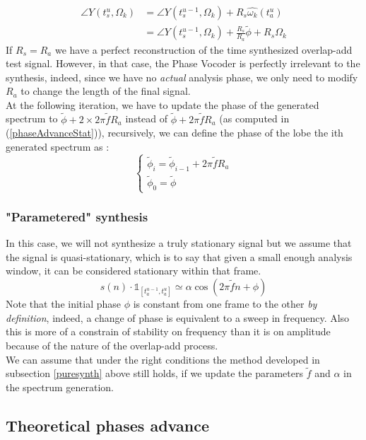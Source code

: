 \documentclass[]{article}
\begin{document}
\begin{equation*}
\begin{split}
\angle Y(t_s^u, \Omega_k) & = \angle Y(t_s^{u-1}, \Omega_k) + R_s \hat{\omega_k}(t_a^u)\\
& = \angle Y(t_s^{u-1}, \Omega_k) + \frac{R_s}{R_a}\tilde{\phi} + R_s\Omega_k
\end{split}
\end{equation*}
If $R_s = R_a$ we have a perfect reconstruction of the time synthesized overlap-add test signal. However, in that case, the Phase Vocoder is perfectly irrelevant to the synthesis, indeed, since we have no \emph{actual} analysis phase, we only need to modify $R_a$ to change the length of the final signal.\\
At the following iteration, we have to update the phase of the generated spectrum to $\tilde{\phi} + 2\times2\pi \tilde{f} R_a$ instead of $\tilde{\phi} + 2\pi \tilde{f} R_a$ (as computed in (\ref{phaseAdvanceStat})), recursively, we can define the phase of the lobe the ith generated spectrum as :
\begin{equation}
\begin{cases}
\tilde{\phi}_i = \tilde{\phi}_{i-1} + 2\pi \tilde{f} R_a \\
\tilde{\phi}_0 = \tilde{\phi}
\end{cases}
\end{equation}
\subsubsection{"Parametered" synthesis}
In this case, we will not synthesize a truly stationary signal but we assume that the signal is quasi-stationary, which is to say that given a small enough analysis window, it can be considered stationary within that frame.
\begin{equation}
s(n)\cdot \mathds{1}_{[t_a^{u-1}, t_a^u]} \simeq \alpha \cos(2\pi\tilde{f} n + \phi)
\end{equation}
Note that the initial phase $\phi$ is constant from one frame to the other \emph{by definition}, indeed, a change of phase is equivalent to a sweep in frequency. Also this is more of a constrain of stability on frequency than it is on amplitude because of the nature of the overlap-add process.\\
We can assume that under the right conditions the method developed in subsection \ref{puresynth} above still holds, if we update the parameters $\tilde{f}$ and $\alpha$ in the spectrum generation.
\subsection{Theoretical phases advance}\label{theoretical_phase_advance}
\end{document}
